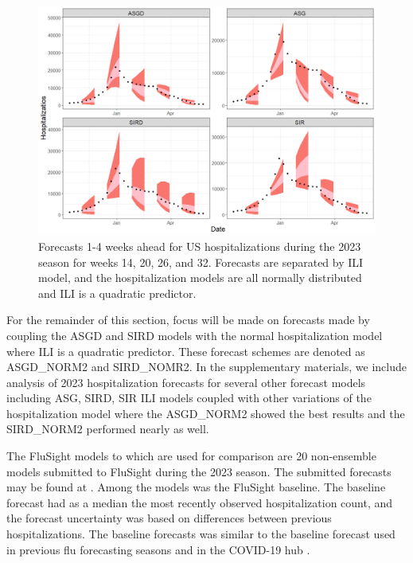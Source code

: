 \begin{figure}[hbt!]

  \centering
  \begin{adjustwidth}{-1cm}{-1.9cm}
  \includegraphics[scale=.45]{Images/normal_sq_forecasts_us.png}
  \end{adjustwidth}
\caption{Forecasts 1-4 weeks ahead for US hospitalizations during the 2023 
season for weeks 14, 20, 26, and 32. Forecasts are separated by ILI model, 
and the hospitalization models are all normally distributed and ILI is a 
quadratic predictor.}
\label{fig:normal_flu_forecasts}
\end{figure}

For the
remainder of this section, focus will be made on forecasts made by coupling the
ASGD and SIRD models with the 
normal hospitalization model where ILI is a quadratic predictor.
These forecast schemes are denoted as ASGD\_NORM2 and SIRD\_NOMR2. 
In the supplementary materials, we include analysis of 2023 hospitalization
forecasts for several other forecast
models including ASG, SIRD, SIR ILI models coupled with other variations of the
hospitalization model where the ASGD\_NORM2 showed the best results
and the SIRD\_NORM2 performed nearly as well.


The FluSight 
models to which are used for comparison are
20 non-ensemble models
submitted to FluSight during the 2023 season.
The submitted forecasts may be found at \cite{mathis2023flusight}.
Among the models
was the FluSight baseline. The baseline forecast had as a median the most 
recently observed 
hospitalization count, and the forecast uncertainty was based on 
differences between 
previous hospitalizations. The baseline forecasts was
similar to the baseline forecast used in
previous flu forecasting seasons and in the COVID-19 hub 
\cite[]{mathis2024evaluation, Cramer2022-hub-dataset}.

